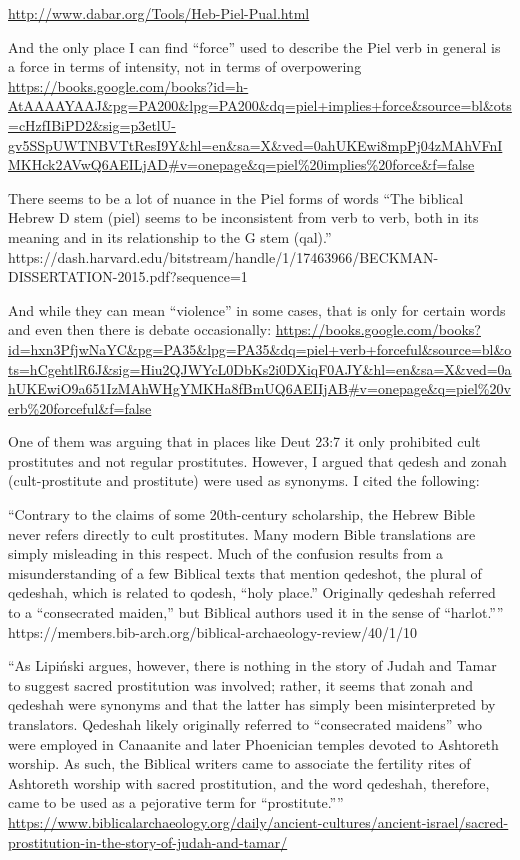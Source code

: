 \documentclass[11pt]{article}
\begin{document}
\url{http://www.dabar.org/Tools/Heb-Piel-Pual.html}

And the only place I can find “force” used to describe the Piel verb in general is a force in terms of intensity, not in terms of overpowering
\url{https://books.google.com/books?id=h-AtAAAAYAAJ&pg=PA200&lpg=PA200&dq=piel+implies+force&source=bl&ots=cHzfIBiPD2&sig=p3etlU-gv5SSpUWTNBVTtResI9Y&hl=en&sa=X&ved=0ahUKEwi8mpPj04zMAhVFnIMKHck2AVwQ6AEILjAD#v=onepage&q=piel%20implies%20force&f=false}

There seems to be a lot of nuance in the Piel forms of words
“The biblical Hebrew D stem (piel) seems to be inconsistent from verb to verb, both in its meaning and in its relationship to the G stem (qal).”
https://dash.harvard.edu/bitstream/handle/1/17463966/BECKMAN-DISSERTATION-2015.pdf?sequence=1

And while they can mean “violence” in some cases, that is only for certain words and even then there is debate occasionally:
\url{https://books.google.com/books?id=hxn3PfjwNaYC&pg=PA35&lpg=PA35&dq=piel+verb+forceful&source=bl&ots=hCgehtlR6J&sig=Hiu2QJWYcL0DbKs2i0DXiqF0AJY&hl=en&sa=X&ved=0ahUKEwiO9a651IzMAhWHgYMKHa8fBmUQ6AEIIjAB#v=onepage&q=piel%20verb%20forceful&f=false}

One of them was arguing that in places like Deut 23:7 it only prohibited cult prostitutes and not regular prostitutes. However, I argued that qedesh and zonah (cult-prostitute and prostitute) were used as synonyms. I cited the following:

“Contrary to the claims of some 20th-century scholarship, the Hebrew Bible never refers directly to cult prostitutes. Many modern Bible translations are simply misleading in this respect. Much of the confusion results from a misunderstanding of a few Biblical texts that mention qedeshot, the plural of qedeshah, which is related to qodesh, “holy place.” Originally qedeshah referred to a “consecrated maiden,” but Biblical authors used it in the sense of “harlot.””
https://members.bib-arch.org/biblical-archaeology-review/40/1/10

“As Lipiński argues, however, there is nothing in the story of Judah and Tamar to suggest sacred prostitution was involved; rather, it seems that zonah and qedeshah were synonyms and that the latter has simply been misinterpreted by translators.
Qedeshah likely originally referred to “consecrated maidens” who were employed in Canaanite and later Phoenician temples devoted to Ashtoreth worship. As such, the Biblical writers came to associate the fertility rites of Ashtoreth worship with sacred prostitution, and the word qedeshah, therefore, came to be used as a pejorative term for “prostitute.””
\url{https://www.biblicalarchaeology.org/daily/ancient-cultures/ancient-israel/sacred-prostitution-in-the-story-of-judah-and-tamar/}
\end{document}
